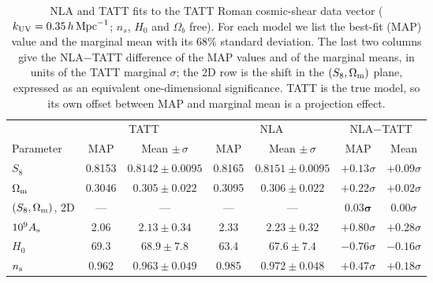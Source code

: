 \begin{table}
\centering
\caption{NLA and TATT fits to the TATT Roman cosmic-shear data vector
($k_{\rm UV} = 0.35\,h\,{\rm Mpc}^{-1}$; $n_s$, $H_0$ and $\Omega_b$ free).
For each model we list the best-fit (MAP) value and the marginal mean with
its 68\% standard deviation. The last two columns give the NLA$-$TATT
difference of the MAP values and of the marginal means, in units of the TATT
marginal $\sigma$; the 2D row is the shift in the $(S_8, \Omega_{\rm m})$
plane, expressed as an equivalent one-dimensional significance. TATT is the
true model, so its own offset between MAP and marginal mean is a projection
effect.}
\label{tab:cs_results}
\begin{tabular}{lcccccc}
\hline\hline
 & \multicolumn{2}{c}{TATT} & \multicolumn{2}{c}{NLA} & \multicolumn{2}{c}{NLA$-$TATT} \\
Parameter & MAP & Mean $\pm\,\sigma$ & MAP & Mean $\pm\,\sigma$ & MAP & Mean \\
\hline
$S_8$            & 0.8153 & $0.8142 \pm 0.0095$ & 0.8165 & $0.8151 \pm 0.0095$ & $+0.13\sigma$ & $+0.09\sigma$ \\
$\Omega_{\rm m}$ & 0.3046 & $0.305 \pm 0.022$   & 0.3095 & $0.306 \pm 0.022$   & $+0.22\sigma$ & $+0.02\sigma$ \\
$(S_8,\Omega_{\rm m})$, 2D & --- & --- & --- & --- & $\mathbf{0.03\sigma}$ & $0.00\sigma$ \\
\hline
$10^9 A_{\rm s}$ & 2.06   & $2.13 \pm 0.34$     & 2.33   & $2.23 \pm 0.32$     & $+0.80\sigma$ & $+0.28\sigma$ \\
$H_0$            & 69.3   & $68.9 \pm 7.8$      & 63.4   & $67.6 \pm 7.4$      & $-0.76\sigma$ & $-0.16\sigma$ \\
$n_{\rm s}$      & 0.962  & $0.963 \pm 0.049$   & 0.985  & $0.972 \pm 0.048$   & $+0.47\sigma$ & $+0.18\sigma$ \\
\hline\hline
\end{tabular}
\end{table}
